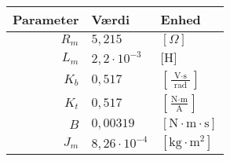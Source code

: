 \begin{tabular}{r|l|l}
Parameter&Værdi&Enhed\\\hline
\(R_m\)&\(5,215\)&\([\Omega]\)\\
\(L_m\)&\(2,2\cdot{}10^{-3}\)&\(\text{[H]}\)\\
\(K_b\)&\(0,517\)&\(\left[ \frac{\text{V} \cdot \text{s} }{ \text{ rad } }  \right] \)\\
\(K_t\)&\(0,517\)&\(\left[ \frac{\text{N}\cdot \text{m}}{\text{A}} \right] \)\\
\(B\)&\(0,00319\)&\(\left[  \text{N} \cdot \text{m} \cdot \text{s}\right] \)\\
\(J_m\)&\(8,26\cdot10^{-4}\)&\(\left[ \text{kg}\cdot{\text{m}^2} \right]  \)\\
\end{tabular}